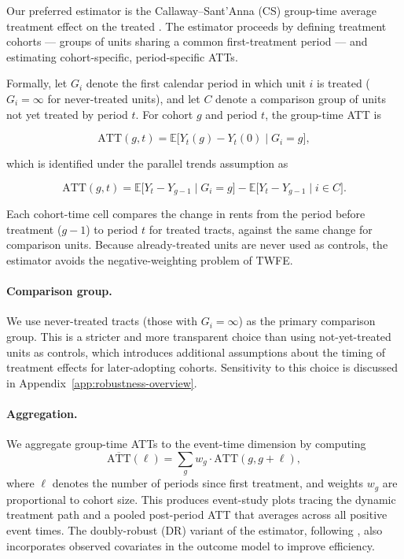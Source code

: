 Our preferred estimator is the Callaway--Sant'Anna (CS) group-time average treatment effect on the treated \citep{callaway2021difference}. The estimator proceeds by defining treatment cohorts --- groups of units sharing a common first-treatment period --- and estimating cohort-specific, period-specific ATTs.

Formally, let $G_i$ denote the first calendar period in which unit $i$ is treated ($G_i = \infty$ for never-treated units), and let $C$ denote a comparison group of units not yet treated by period $t$. For cohort $g$ and period $t$, the group-time ATT is

\[
\mathrm{ATT}(g, t) = \mathbb{E}\bigl[Y_t(g) - Y_t(0) \mid G_i = g\bigr],
\]

which is identified under the parallel trends assumption as

\[
\mathrm{ATT}(g, t) = \mathbb{E}\bigl[Y_t - Y_{g-1} \mid G_i = g\bigr] - \mathbb{E}\bigl[Y_t - Y_{g-1} \mid i \in C\bigr].
\]

Each cohort-time cell compares the change in rents from the period before treatment ($g-1$) to period $t$ for treated tracts, against the same change for comparison units. Because already-treated units are never used as controls, the estimator avoids the negative-weighting problem of TWFE.

\paragraph{Comparison group.} We use never-treated tracts (those with $G_i = \infty$) as the primary comparison group. This is a stricter and more transparent choice than using not-yet-treated units as controls, which introduces additional assumptions about the timing of treatment effects for later-adopting cohorts. Sensitivity to this choice is discussed in Appendix~\ref{app:robustness-overview}.

\paragraph{Aggregation.} We aggregate group-time ATTs to the event-time dimension by computing
\[
\overline{\mathrm{ATT}}(\ell) = \sum_{g} w_g \cdot \mathrm{ATT}(g, g + \ell),
\]
where $\ell$ denotes the number of periods since first treatment, and weights $w_g$ are proportional to cohort size. This produces event-study plots tracing the dynamic treatment path and a pooled post-period ATT that averages across all positive event times. The doubly-robust (DR) variant of the estimator, following \citet{santanna2020doubly}, also incorporates observed covariates in the outcome model to improve efficiency.

